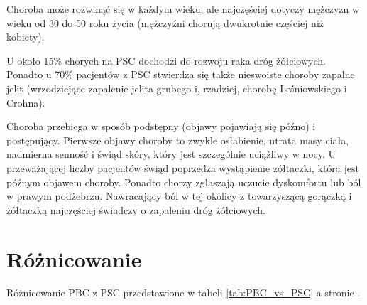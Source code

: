 Choroba może rozwinąć się w każdym wieku, ale najczęściej dotyczy mężczyzn w wieku od 30 do 50 roku życia (mężczyźni chorują dwukrotnie częściej niż kobiety). 

U około 15\% chorych na PSC dochodzi do rozwoju raka dróg żółciowych. 
Ponadto u 70\% pacjentów z PSC stwierdza się także nieswoiste choroby zapalne jelit (wrzodziejące zapalenie jelita grubego i, rzadziej, chorobę Leśniowskiego i Crohna). 

Choroba przebiega w sposób podstępny (objawy pojawiają się późno) i postępujący. 
Pierwsze objawy choroby to zwykle osłabienie, utrata masy ciała, nadmierna senność i świąd skóry, który jest szczególnie uciążliwy w nocy. 
U przeważającej liczby pacjentów świąd poprzedza wystąpienie żółtaczki, która jest późnym objawem choroby. Ponadto chorzy zgłaszają uczucie dyskomfortu lub ból w prawym podżebrzu. 
Nawracający ból w tej okolicy z towarzyszącą gorączką i żółtaczką najczęściej świadczy o zapaleniu dróg żółciowych.

\section{Różnicowanie}

Różnicowanie PBC  z PSC przedstawione w tabeli \ref{tab:PBC_vs_PSC} a stronie \pageref{tab:PBC_vs_PSC}.

